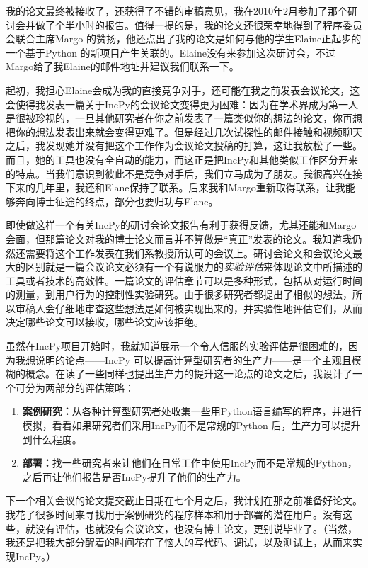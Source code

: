 \documentclass[letter,12pt]{book}
\begin{document}
\begin{CJK}{UTF8}{gbsn}
我的论文最终被接收了，还获得了不错的审稿意见，我在2010年2月参加了那个研讨会并做了个半小时的报告。值得一提的是，我的论文还很荣幸地得到了程序委员会联合主席Margo 的赞扬，他还点出了我的论文是如何与他的学生Elaine正起步的一个基于Python 的新项目产生关联的。Elaine没有来参加这次研讨会，不过Margo给了我Elaine的邮件地址并建议我们联系一下。

起初，我担心Elaine会成为我的直接竞争对手，还可能在我之前发表会议论文，这会使得我发表一篇关于IncPy的会议论文变得更为困难：因为在学术界成为第一人是很被珍视的，一旦其他研究者在你之前发表了一篇类似你的想法的论文，你再想把你的想法发表出来就会变得更难了。但是经过几次试探性的邮件接触和视频聊天之后，我发现她并没有把这个工作作为会议论文投稿的打算，这让我放松了一些。而且，她的工具也没有全自动的能力，而这正是把IncPy和其他类似工作区分开来的特点。当我们意识到彼此不是竞争对手后，我们立马成为了朋友。我很高兴在接下来的几年里，我还和Elane保持了联系。后来我和Margo重新取得联系，让我能够奔向博士征途的终点，部分也要归功与Elane。

\breakline

即使做这样一个有关IncPy的研讨会论文报告有利于获得反馈，尤其还能和Margo会面，但那篇论文对我的博士论文而言并不算做是“真正”发表的论文。我知道我仍然还需要将这个工作发表在我们系教授所认可的会议上。研讨会论文和会议论文最大的区别就是一篇会议论文必须有一个有说服力的\emph{实验评估}来体现论文中所描述的工具或者技术的高效性。一篇论文的评估章节可以是多种形式，包括从对运行时间的测量，到用户行为的控制性实验研究。由于很多研究者都提出了相似的想法，所以审稿人会仔细地审查这些想法是如何被实现出来的，并实验性地评估它们，从而决定哪些论文可以接收，哪些论文应该拒绝。

虽然在IncPy项目开始时，我就知道展示一个令人信服的实验评估是很困难的，因为我想说明的论点——IncPy 可以提高计算型研究者的生产力——是一个主观且模糊的概念。在读了一些同样也提出生产力的提升这一论点的论文之后，我设计了一个可分为两部分的评估策略：
\begin{enumerate}
  \item \textbf{案例研究：}从各种计算型研究者处收集一些用Python语言编写的程序，并进行模拟，看看如果研究者们采用IncPy而不是常规的Python 后，生产力可以提升到什么程度。
  \item \textbf{部署：}找一些研究者来让他们在日常工作中使用IncPy而不是常规的Python，之后再让他们报告是否IncPy提升了他们的生产力。
\end{enumerate}
下一个相关会议的论文提交截止日期在七个月之后，我计划在那之前准备好论文。我花了很多时间来寻找用于案例研究的程序样本和用于部署的潜在用户。没有这些，就没有评估，也就没有会议论文，也没有博士论文，更别说毕业了。（当然，我还是把我大部分醒着的时间花在了恼人的写代码、调试，以及测试上，从而来实现IncPy。）


\end{CJK}
\end{document}
